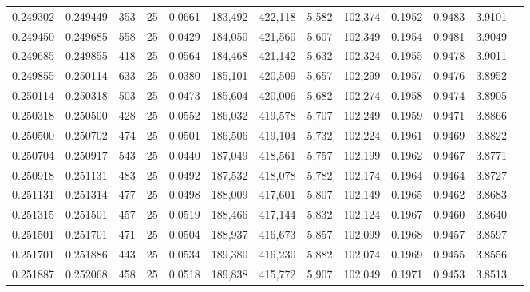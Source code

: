 \begin{tabular}{rrrrrrrrrrrrr}
0.249302 & 0.249449 &   353 &  25 &                                     0.0661 & 183,492 & 422,118 &   5,582 & 102,374 & 0.1952 & 0.9483 & 3.9101 \\
0.249450 & 0.249685 &   558 &  25 &                                     0.0429 & 184,050 & 421,560 &   5,607 & 102,349 & 0.1954 & 0.9481 & 3.9049 \\
0.249685 & 0.249855 &   418 &  25 &                                     0.0564 & 184,468 & 421,142 &   5,632 & 102,324 & 0.1955 & 0.9478 & 3.9011 \\
0.249855 & 0.250114 &   633 &  25 &                                     0.0380 & 185,101 & 420,509 &   5,657 & 102,299 & 0.1957 & 0.9476 & 3.8952 \\
0.250114 & 0.250318 &   503 &  25 &                                     0.0473 & 185,604 & 420,006 &   5,682 & 102,274 & 0.1958 & 0.9474 & 3.8905 \\
0.250318 & 0.250500 &   428 &  25 &                                     0.0552 & 186,032 & 419,578 &   5,707 & 102,249 & 0.1959 & 0.9471 & 3.8866 \\
0.250500 & 0.250702 &   474 &  25 &                                     0.0501 & 186,506 & 419,104 &   5,732 & 102,224 & 0.1961 & 0.9469 & 3.8822 \\
0.250704 & 0.250917 &   543 &  25 &                                     0.0440 & 187,049 & 418,561 &   5,757 & 102,199 & 0.1962 & 0.9467 & 3.8771 \\
0.250918 & 0.251131 &   483 &  25 &                                     0.0492 & 187,532 & 418,078 &   5,782 & 102,174 & 0.1964 & 0.9464 & 3.8727 \\
0.251131 & 0.251314 &   477 &  25 &                                     0.0498 & 188,009 & 417,601 &   5,807 & 102,149 & 0.1965 & 0.9462 & 3.8683 \\
0.251315 & 0.251501 &   457 &  25 &                                     0.0519 & 188,466 & 417,144 &   5,832 & 102,124 & 0.1967 & 0.9460 & 3.8640 \\
0.251501 & 0.251701 &   471 &  25 &                                     0.0504 & 188,937 & 416,673 &   5,857 & 102,099 & 0.1968 & 0.9457 & 3.8597 \\
0.251701 & 0.251886 &   443 &  25 &                                     0.0534 & 189,380 & 416,230 &   5,882 & 102,074 & 0.1969 & 0.9455 & 3.8556 \\
0.251887 & 0.252068 &   458 &  25 &                                     0.0518 & 189,838 & 415,772 &   5,907 & 102,049 & 0.1971 & 0.9453 & 3.8513 \\

\end{tabular}

